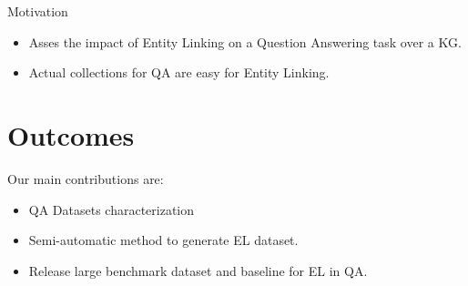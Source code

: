 \documentclass[]{beamer}
\begin{document}
  \begin{frame}{\secname}
    \begin{alertblock}{Motivation}
      \begin{itemize}
        \item Asses the impact of Entity Linking on a Question Answering task over a KG.
        \item Actual collections for QA are easy for Entity Linking.
      \end{itemize}
    \end{alertblock}
  \end{frame}

\section{Outcomes}
  \begin{frame}{\secname}
    \begin{alertblock}{Our main contributions are:}
      \begin{itemize}
        \item QA Datasets characterization
        \item Semi-automatic method to generate EL dataset.
        \item Release large benchmark dataset and baseline for EL in QA.
      \end{itemize}
    \end{alertblock}      
  \end{frame}
\end{document}
